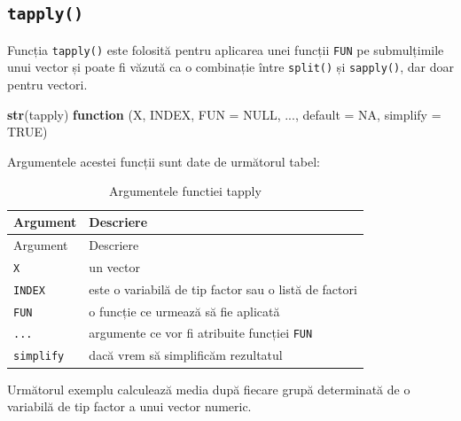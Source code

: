 \documentclass[]{article}
\newenvironment{Shaded}{\begin{snugshade}}{\end{snugshade}}
\newcommand{\ControlFlowTok}[1]{\textcolor[rgb]{0.13,0.29,0.53}{\textbf{#1}}}
\newcommand{\DataTypeTok}[1]{\textcolor[rgb]{0.13,0.29,0.53}{#1}}
\newcommand{\KeywordTok}[1]{\textcolor[rgb]{0.13,0.29,0.53}{\textbf{#1}}}
\newcommand{\NormalTok}[1]{#1}
\newcommand{\OtherTok}[1]{\textcolor[rgb]{0.56,0.35,0.01}{#1}}
\newcounter{exo}[section]
\begin{document}
\hypertarget{tapply}{%
\subsection{\texorpdfstring{\texttt{tapply()}}{tapply()}}\label{tapply}}

Funcția \texttt{tapply()} este folosită pentru aplicarea unei funcții
\texttt{FUN} pe submulțimile unui vector și poate fi văzută ca o
combinație între \texttt{split()} și \texttt{sapply()}, dar doar pentru
vectori.

\begin{Shaded}
\begin{Highlighting}[]
\KeywordTok{str}\NormalTok{(tapply)}
\ControlFlowTok{function}\NormalTok{ (X, INDEX, }\DataTypeTok{FUN =} \OtherTok{NULL}\NormalTok{, ..., }\DataTypeTok{default =} \OtherTok{NA}\NormalTok{, }\DataTypeTok{simplify =} \OtherTok{TRUE}\NormalTok{)  }
\end{Highlighting}
\end{Shaded}

Argumentele acestei funcții sunt date de următorul tabel:

\begin{longtable}[]{@{}ll@{}}
\caption{Argumentele functiei tapply}\tabularnewline
\toprule
Argument & Descriere\tabularnewline
\midrule
\endfirsthead
\toprule
Argument & Descriere\tabularnewline
\midrule
\endhead
\texttt{X} & un vector\tabularnewline
\texttt{INDEX} & este o variabilă de tip factor sau o listă de
factori\tabularnewline
\texttt{FUN} & o funcție ce urmează să fie aplicată\tabularnewline
\texttt{...} & argumente ce vor fi atribuite funcției
\texttt{FUN}\tabularnewline
\texttt{simplify} & dacă vrem să simplificăm rezultatul\tabularnewline
\bottomrule
\end{longtable}

Următorul exemplu calculează media după fiecare grupă determinată de o
variabilă de tip factor a unui vector numeric.
\end{document}
